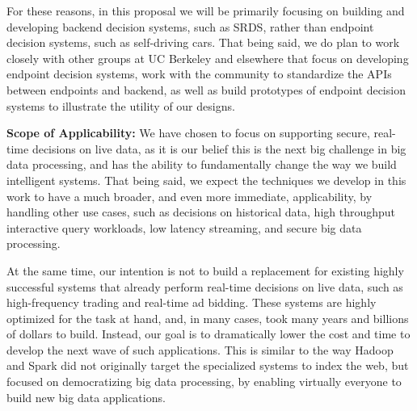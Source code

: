 For these reasons, in this proposal we will be primarily focusing on building and developing backend decision systems, such as SRDS, rather than endpoint decision systems, such as self-driving cars. That being said, we do plan to work closely with other groups at UC Berkeley and elsewhere that focus on developing endpoint decision systems, work with the community to standardize the APIs between endpoints and backend, as well as build prototypes of endpoint decision systems to illustrate the utility of our designs.  


{\bf Scope of Applicability:} We have chosen to focus on supporting secure, real-time decisions on live data, as it is our belief this is the next big challenge in big data processing, and has the ability to fundamentally change the way we build intelligent systems. That being said, we expect the techniques we develop in this work to have a much broader, and even more immediate, applicability, by handling other use cases, such as decisions on historical data, high throughput interactive query workloads, low latency streaming, and secure big data processing.

At the same time, our intention is not to build a replacement for existing highly successful systems that already perform real-time decisions on live data, such as high-frequency trading and real-time ad bidding. These systems are highly optimized for the task at hand, and, in many cases, took many years and billions of dollars to build. Instead, our goal is to dramatically lower the cost and time to develop the next wave of such applications. This is similar to the way Hadoop and Spark did not originally target the specialized systems to index the web, but focused on democratizing big data processing, by enabling virtually everyone to build new big data applications.
